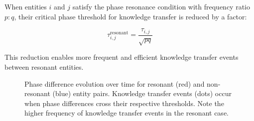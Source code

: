 \begin{theorem}
When entities $i$ and $j$ satisfy the phase resonance condition with frequency ratio $p:q$, their critical phase threshold for knowledge transfer is reduced by a factor:

\begin{equation}
\tau_{i,j}^{\text{resonant}} = \frac{\tau_{i,j}}{\sqrt{pq}}
\end{equation}

This reduction enables more frequent and efficient knowledge transfer events between resonant entities.
\end{theorem}

\begin{figure}[ht]
\centering
{}
\caption{Phase difference evolution over time for resonant (red) and non-resonant (blue) entity pairs. Knowledge transfer events (dots) occur when phase differences cross their respective thresholds. Note the higher frequency of knowledge transfer events in the resonant case.}
\label{fig:resonant_threshold_crossing}
\end{figure}



